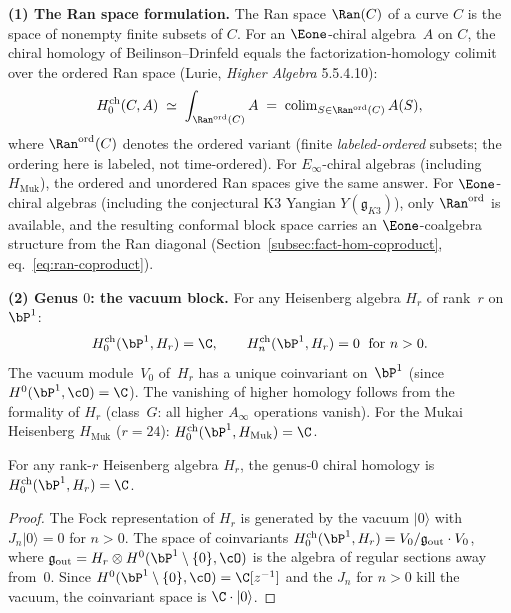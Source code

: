 \medskip
\noindent\textbf{(1) The Ran space formulation.}
The Ran space $\Ran(C)$ of a curve $C$ is the space of nonempty finite subsets of $C$. For an $\Eone$-chiral algebra~$A$ on $C$, the chiral homology of Beilinson--Drinfeld equals the factorization-homology colimit over the ordered Ran space (Lurie, \emph{Higher Algebra} 5.5.4.10):
\begin{equation}\label{eq:ran-ch-equivalence}
 H_0^{\mathrm{ch}}(C, A)
 \;\simeq\;
 \int_{\Ran^{\mathrm{ord}}(C)} A
 \;=\;
 \operatorname{colim}_{S \in \Ran^{\mathrm{ord}}(C)} A(S),
\end{equation}
where $\Ran^{\mathrm{ord}}(C)$ denotes the ordered variant (finite \emph{labeled-ordered} subsets; the ordering here is labeled, not time-ordered). For $E_\infty$-chiral algebras (including $H_{\mathrm{Muk}}$), the ordered and unordered Ran spaces give the same answer. For $\Eone$-chiral algebras (including the conjectural K3 Yangian $Y(\mathfrak{g}_{K3})$), only $\Ran^{\mathrm{ord}}$ is available, and the resulting conformal block space carries an $\Eone$-coalgebra structure from the Ran diagonal (Section~\ref{subsec:fact-hom-coproduct}, eq.~\eqref{eq:ran-coproduct}).

\medskip
\noindent\textbf{(2) Genus $0$: the vacuum block.}
For any Heisenberg algebra $H_r$ of rank~$r$ on~$\bP^1$:
\begin{equation}\label{eq:ch-hom-p1}
 H_0^{\mathrm{ch}}(\bP^1, H_r) = \C, \qquad
 H_n^{\mathrm{ch}}(\bP^1, H_r) = 0 \;\text{ for } n > 0.
\end{equation}
The vacuum module~$V_0$ of~$H_r$ has a unique coinvariant on~$\bP^1$ (since $H^0(\bP^1, \cO) = \C$). The vanishing of higher homology follows from the formality of $H_r$ (class~$G$: all higher $A_\infty$ operations vanish). For the Mukai Heisenberg $H_{\mathrm{Muk}}$ ($r = 24$): $H_0^{\mathrm{ch}}(\bP^1, H_{\mathrm{Muk}}) = \C$.

\begin{proposition}
\label{prop:vacuum-block-p1}
For any rank-$r$ Heisenberg algebra $H_r$, the genus-$0$ chiral homology is $H_0^{\mathrm{ch}}(\bP^1, H_r) = \C$.
\end{proposition}

\begin{proof}
The Fock representation of $H_r$ is generated by the vacuum $|0\rangle$ with $J_n |0\rangle = 0$ for $n > 0$.
The space of coinvariants $H_0^{\mathrm{ch}}(\bP^1, H_r) = V_0 / \mathfrak{g}_{\mathrm{out}} \cdot V_0$, where $\mathfrak{g}_{\mathrm{out}} = H_r \otimes H^0(\bP^1 \setminus \{0\}, \cO)$ is the algebra of regular sections away from~$0$.
Since $H^0(\bP^1 \setminus \{0\}, \cO) = \C[z^{-1}]$ and the $J_n$ for $n > 0$ kill the vacuum, the coinvariant space is $\C \cdot |0\rangle$.
\end{proof}

